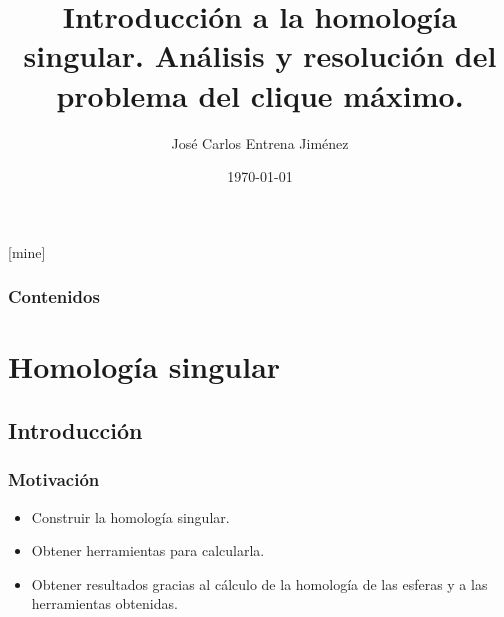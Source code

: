 \documentclass{beamer}
\title[Homología singular. Problema del clíque máximo.]{Introducción a la homología singular. Análisis y resolución del problema del clique máximo.} %
\author{José Carlos Entrena Jiménez} %
\institute[UGR] %
{
  Universidad de Granada \\ %
  \medskip
  \textit{jentrena@correo.ugr.es} %
}
\date{\today} %
\theoremstyle{theorem}
\begin{document}
\theoremstyle{definition}
[mine]

\frame{\titlepage}

\begin{frame}
  \frametitle{Contenidos} %
  \tableofcontents
\end{frame}



\section{Homología singular} %

\subsection{Introducción} %


\begin{frame}
  \frametitle{Motivación}
  \begin{itemize}
    \item Construir la homología singular.
    \item Obtener herramientas para calcularla.
    \item Obtener resultados gracias al cálculo de la homología de las esferas  y a las herramientas obtenidas.
  \end{itemize}

\end{frame}
\end{document}
